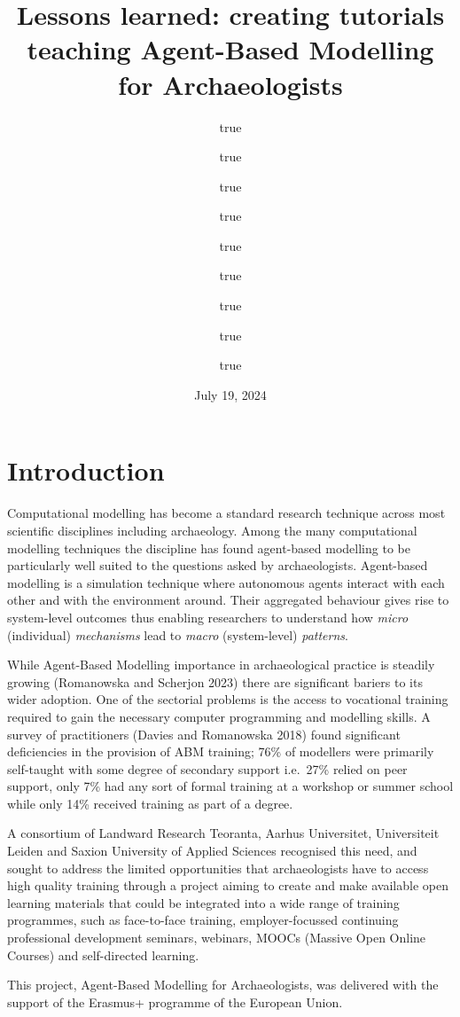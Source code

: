 \documentclass[
]{article}
\title{Lessons learned: creating tutorials teaching Agent-Based Modelling for Archaeologists}
\author{true \and true \and true \and true \and true \and true \and true \and true \and true}
\date{July 19, 2024}
\begin{document}
\maketitle

{
\setcounter{tocdepth}{2}
\tableofcontents
}
\hypertarget{introduction}{%
\section{Introduction}\label{introduction}}

Computational modelling has become a standard research technique across most scientific disciplines including archaeology. Among the many computational modelling techniques the discipline has found agent-based modelling to be particularly well suited to the questions asked by archaeologists. Agent-based modelling is a simulation technique where autonomous agents interact with each other and with the environment around. Their aggregated behaviour gives rise to system-level outcomes thus enabling researchers to understand how \emph{micro} (individual) \emph{mechanisms} lead to \emph{macro} (system-level) \emph{patterns}.

While Agent-Based Modelling importance in archaeological practice is steadily growing (Romanowska and Scherjon 2023) there are significant bariers to its wider adoption. One of the sectorial problems is the access to vocational training required to gain the necessary computer programming and modelling skills. A survey of practitioners (Davies and Romanowska 2018) found significant deficiencies in the provision of ABM training; 76\% of modellers were primarily self-taught with some degree of secondary support i.e.~27\% relied on peer support, only 7\% had any sort of formal training at a workshop or summer school while only 14\% received training as part of a degree.

A consortium of Landward Research Teoranta, Aarhus Universitet, Universiteit Leiden and Saxion University of Applied Sciences recognised this need, and sought to address the limited opportunities that archaeologists have to access high quality training through a project aiming to create and make available open learning materials that could be integrated into a wide range of training programmes, such as face-to-face training, employer-focussed continuing professional development seminars, webinars, MOOCs (Massive Open Online Courses) and self-directed learning.

This project, Agent-Based Modelling for Archaeologists, was delivered with the support of the Erasmus+ programme of the European Union.
\end{document}
